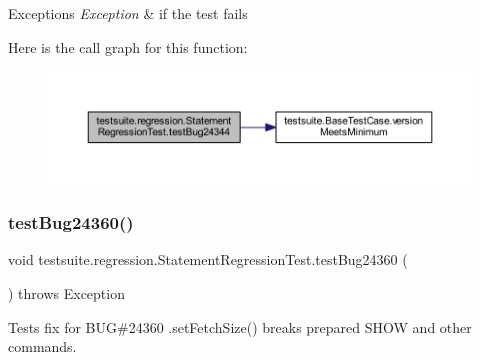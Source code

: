 \begin{DoxyExceptions}{Exceptions}
{\em Exception} & if the test fails \\
\hline
\end{DoxyExceptions}
Here is the call graph for this function\+:
\nopagebreak
\begin{figure}[H]
\begin{center}
\leavevmode
\includegraphics[width=350pt]{classtestsuite_1_1regression_1_1_statement_regression_test_a4da675927e9f55846b0ea0781c439c48_cgraph}
\end{center}
\end{figure}
\mbox{\label{classtestsuite_1_1regression_1_1_statement_regression_test_a3334c82a4ef7ac982bf6eca6fc081027}} 
\subsubsection{\texorpdfstring{test\+Bug24360()}{testBug24360()}}
{\footnotesize\ttfamily void testsuite.\+regression.\+Statement\+Regression\+Test.\+test\+Bug24360 (\begin{DoxyParamCaption}{ }\end{DoxyParamCaption}) throws Exception}

Tests fix for B\+UG\#24360 .set\+Fetch\+Size() breaks prepared S\+H\+OW and other commands.


